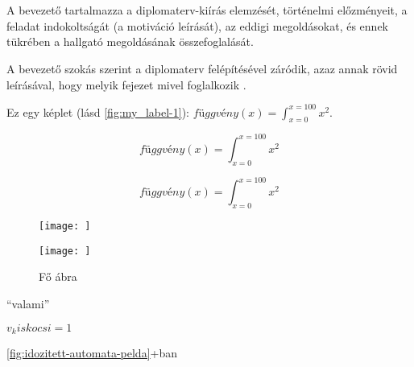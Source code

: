 \chapter{\bevezetes}
A bevezető tartalmazza a diplomaterv-kiírás elemzését, történelmi előzményeit, a feladat indokoltságát (a motiváció leírását), az eddigi megoldásokat, és ennek tükrében a hallgató megoldásának összefoglalását.

A bevezető szokás szerint a diplomaterv felépítésével záródik, azaz annak rövid leírásával, hogy melyik fejezet mivel foglalkozik \cite{Candy86}.

Ez egy képlet (lásd \ref{fig:my_label-1}): $\mathit{függvény}(x) = \int_{x=0}^{x=100} x^2$.

\[
\mathit{függvény}(x) = \int_{x=0}^{x=100} x^2
\]

\begin{equation*}
    \mathit{függvény}(x) = \int_{x=0}^{x=100} x^2
\end{equation*}

\begin{figure}[t]
    \begin{minipage}[b]{0.49\textwidth}
        \centering
        \texttt{[image: ]}
        \vspace{0}
        \label{fig:my_label-1}
    \end{minipage}
    \begin{minipage}[b]{0.49\textwidth}
        \centering
        \texttt{[image: ]}
        \vspace{0}
        \label{fig:my_label-2}
    \end{minipage}
    \caption{Fő ábra}
    \label{fig:my_label}
\end{figure}

``valami''

$v_kiskocsi = 1$

\newcommand{\aban}[1]{\atold#1+ban{}}
\aban{\ref{fig:idozitett-automata-pelda}}